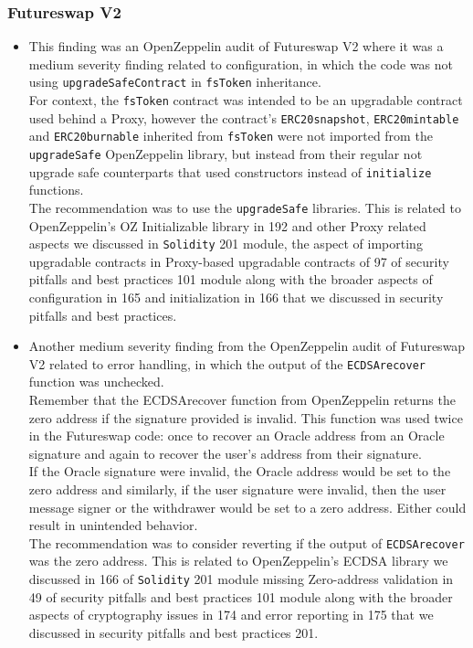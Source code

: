 \subsubsection{Futureswap V2}\label{futureswap-v2}

\begin{itemize}
\item
  This finding was an OpenZeppelin audit of Futureswap V2 where it was a
  medium severity finding related to configuration, in which the code
  was not using \texttt{upgradeSafeContract} in \texttt{fsToken}
  inheritance.\\

  For context, the \texttt{fsToken} contract was intended to be an
  upgradable contract used behind a Proxy, however the contract's
  \texttt{ERC20snapshot}, \texttt{ERC20mintable} and
  \texttt{ERC20burnable} inherited from \texttt{fsToken} were not
  imported from the \texttt{upgradeSafe} OpenZeppelin library, but
  instead from their regular not upgrade safe counterparts that used
  constructors instead of \texttt{initialize} functions.\\

  The recommendation was to use the \texttt{upgradeSafe} libraries. This
  is related to OpenZeppelin's OZ Initializable library in 192 and other
  Proxy related aspects we discussed in \texttt{Solidity} 201 module,
  the aspect of importing upgradable contracts in Proxy-based upgradable
  contracts of 97 of security pitfalls and best practices 101 module
  along with the broader aspects of configuration in 165 and
  initialization in 166 that we discussed in security pitfalls and best
  practices.
\item
  Another medium severity finding from the OpenZeppelin audit of
  Futureswap V2 related to error handling, in which the output of the
  \texttt{ECDSArecover} function was unchecked.\\

  Remember that the ECDSArecover function from OpenZeppelin returns the
  zero address if the signature provided is invalid. This function was
  used twice in the Futureswap code: once to recover an Oracle address
  from an Oracle signature and again to recover the user's address from
  their signature.\\

  If the Oracle signature were invalid, the Oracle address would be set
  to the zero address and similarly, if the user signature were invalid,
  then the user message signer or the withdrawer would be set to a zero
  address. Either could result in unintended behavior.\\

  The recommendation was to consider reverting if the output of
  \texttt{ECDSArecover} was the zero address. This is related to
  OpenZeppelin's ECDSA library we discussed in 166 of \texttt{Solidity}
  201 module missing Zero-address validation in 49 of security pitfalls
  and best practices 101 module along with the broader aspects of
  cryptography issues in 174 and error reporting in 175 that we
  discussed in security pitfalls and best practices 201.
\end{itemize}

